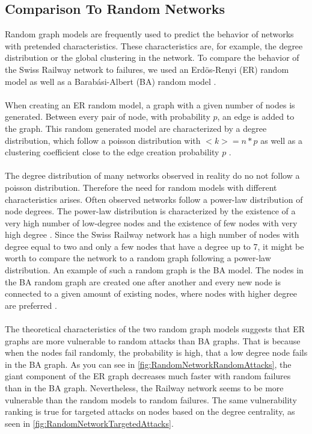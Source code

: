 \documentclass{Resources/netsci-project}
\begin{document}
\subsection{Comparison To Random Networks}
Random graph models are frequently used to predict the behavior of networks with pretended characteristics. These characteristics are, for example, the degree distribution or the global clustering in the network. To compare the behavior of the Swiss Railway network to failures, we used an Erdös-Renyi (ER) random model as well as a Barabási-Albert (BA) random model \autocite{Barabasi}.
\\~\\
When creating an ER random model, a graph with a given number of nodes is generated. Between every pair of node, with probability $ p $, an edge is added to the graph. This random generated model are characterized by a degree distribution, which follow a poisson distribution with $ <k> = n*p $ as well as a clustering coefficient close to the edge creation probability $ p $ \autocite{Barabasi}.
\\~\\
The degree distribution of many networks observed in reality do no not follow a poisson distribution. Therefore the need for random models with different characteristics arises. Often observed networks follow a power-law distribution of node degrees. The power-law distribution is characterized by the existence of a very high number of low-degree nodes and the existence of few nodes with very high degree \autocite{Barabasi}. Since the Swiss Railway network has a high number of nodes with degree equal to two and only a few nodes that have a degree up to 7, it might be worth to compare the network to a random graph following a power-law distribution. An example of such a random graph is the BA model. The nodes in the BA random graph are created one after another and every new node is connected to a given amount of existing nodes, where nodes with higher degree are preferred \autocite{Barabasi}. 
\\~\\
The theoretical characteristics of the two random graph models suggests that ER graphs are more vulnerable to random attacks than BA graphs. That is because when the nodes fail randomly, the probability is high, that a low degree node fails in the BA graph. As you can see in \ref{fig:RandomNetworkRandomAttacks}, the giant component of the ER graph decreases much faster with random failures than in the BA graph. Nevertheless, the Railway network seems to be more vulnerable than the random models to random failures. The same vulnerability ranking is true for targeted attacks on nodes based on the degree centrality, as seen in \ref{fig:RandomNetworkTargetedAttacks}.
\end{document}
